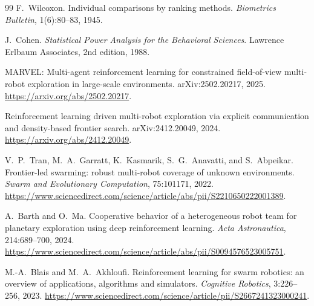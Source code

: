 \documentclass[11pt]{article}
\begin{document}
\begin{thebibliography}{99}
F.~Wilcoxon.
\newblock Individual comparisons by ranking methods.
\newblock \emph{Biometrics Bulletin}, 1(6):80--83, 1945.

J.~Cohen.
\newblock \emph{Statistical Power Analysis for the Behavioral Sciences}.
\newblock Lawrence Erlbaum Associates, 2nd edition, 1988.

MARVEL: Multi-agent reinforcement learning for constrained field-of-view
  multi-robot exploration in large-scale environments.
\newblock arXiv:2502.20217, 2025. \url{https://arxiv.org/abs/2502.20217}.

Reinforcement learning driven multi-robot exploration via explicit
  communication and density-based frontier search.
\newblock arXiv:2412.20049, 2024. \url{https://arxiv.org/abs/2412.20049}.

V.~P.~Tran, M.~A.~Garratt, K.~Kasmarik, S.~G.~Anavatti, and S.~Abpeikar.
\newblock Frontier-led swarming: robust multi-robot coverage of unknown
  environments.
\newblock \emph{Swarm and Evolutionary Computation}, 75:101171, 2022.
\newblock \url{https://www.sciencedirect.com/science/article/abs/pii/S2210650222001389}.

A.~Barth and O.~Ma.
\newblock Cooperative behavior of a heterogeneous robot team for planetary
  exploration using deep reinforcement learning.
\newblock \emph{Acta Astronautica}, 214:689--700, 2024.
\newblock \url{https://www.sciencedirect.com/science/article/abs/pii/S0094576523005751}.

M.-A.~Blais and M.~A.~Akhloufi.
\newblock Reinforcement learning for swarm robotics: an overview of
  applications, algorithms and simulators.
\newblock \emph{Cognitive Robotics}, 3:226--256, 2023.
\newblock \url{https://www.sciencedirect.com/science/article/pii/S2667241323000241}.

\end{thebibliography}
\end{document}
